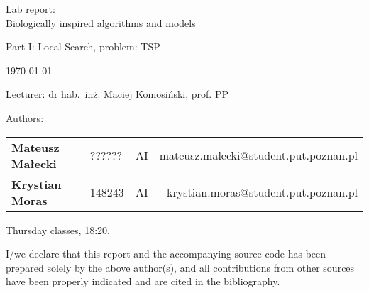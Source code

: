 \thispagestyle{empty} %

\begin{center}
{\large{Lab report:\\
Biologically inspired algorithms and models\\
}}

\vspace{3ex}

Part I: Local Search, problem: TSP

\vspace{3ex}
{\footnotesize\today}

\end{center}


\vspace{10ex}

Lecturer: dr hab.~inż. Maciej Komosiński, prof. PP

\vspace{5ex}

Authors:
\begin{tabular}{lllr}
\textbf{Mateusz Małecki} & ?????? & AI & mateusz.malecki@student.put.poznan.pl \\
\textbf{Krystian Moras} & 148243 & AI & krystian.moras@student.put.poznan.pl \\
\end{tabular}

\vspace{5ex}

Thursday classes, 18:20.

\vspace{35ex}

\noindent I/we declare that this report and the accompanying source code has been prepared solely by the above author(s), and all contributions from other sources have been properly indicated and are cited in the bibliography.  

\newpage

